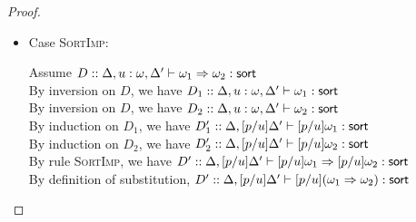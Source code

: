 \begin{proof}
\begin{enumerate}
\begin{itemize}
  \item Case \textsc{SortImp}: 
    \begin{tabbedproof}
      \oo Assume $D :: \judgeSort[\Delta, u:\omega, \Delta']{\omega_1 \To \omega_2}$ \\
      \ooo By inversion on $D$, we have 
             $D_1 :: \judgeSort[\Delta, u:\omega, \Delta']{\omega_1}$ \\
      \ooo By inversion on $D$, we have 
             $D_2 :: \judgeSort[\Delta, u:\omega, \Delta']{\omega_2}$ \\
      \ooo By induction on $D_1$, we have 
             $D'_1 :: \judgeSort[{\Delta, [p/u]\Delta'}]{[p/u]\omega_1}$ \\
      \ooo By induction on $D_2$, we have 
             $D'_2 :: \judgeSort[{\Delta, [p/u]\Delta'}]{[p/u]\omega_2}$ \\
      \ooo By rule \textsc{SortImp}, we have 
            $D' :: \judgeSort[{\Delta, [p/u]\Delta'}]{[p/u]\omega_1 \To [p/u]\omega_2}$ \\
      \ooo By definition of substitution, 
            $D' :: \judgeSort[{\Delta, [p/u]\Delta'}]{[p/u](\omega_1 \To \omega_2)}$ \\
    \end{tabbedproof}


\end{itemize}
\end{enumerate}
\end{proof}
